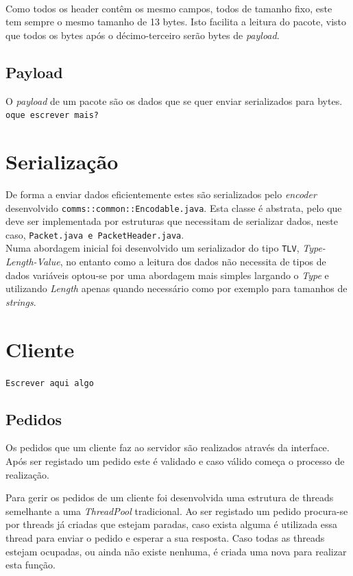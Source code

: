 \documentclass[runningheads]{llncs}
\begin{document}
\noindent
\\ Como todos os header contêm os mesmo campos, todos de tamanho fixo, este tem sempre o mesmo tamanho de 13 bytes. Isto facilita a leitura do pacote, visto que todos os bytes após o décimo-terceiro serão bytes de \emph{payload}.

\subsection{Payload}
O \emph{payload} de um pacote são os dados que se quer enviar serializados para bytes.
\texttt{oque escrever mais?}


\section{Serialização}
De forma a enviar dados eficientemente estes são serializados pelo \emph{encoder} desenvolvido \texttt{comms::common::Encodable.java}. Esta classe é abstrata, pelo que deve ser implementada por estruturas que necessitam de serializar dados, neste caso, \texttt{Packet.java e PacketHeader.java}.
\\
Numa abordagem inicial foi desenvolvido um serializador do tipo \texttt{TLV}, \emph{Type-Length-Value}, no entanto como a leitura dos dados não necessita de tipos de dados variáveis optou-se por uma abordagem mais simples largando o \emph{Type} e utilizando \emph{Length} apenas quando necessário como por exemplo para tamanhos de \emph{strings}.



\section{Cliente}
\texttt{Escrever aqui algo}

\subsection{Pedidos}
Os pedidos que um cliente faz ao servidor são realizados através da interface. Após ser registado um pedido este é validado e caso válido começa o processo de realização.

Para gerir os pedidos de um cliente foi desenvolvida uma estrutura de threads semelhante a uma \emph{ThreadPool} tradicional. Ao ser registado um pedido procura-se por threads já criadas que estejam paradas, caso exista alguma é utilizada essa thread para enviar o pedido e esperar a sua resposta. Caso todas as threads estejam ocupadas, ou ainda não existe nenhuma, é criada uma nova para realizar esta função.
\end{document}
